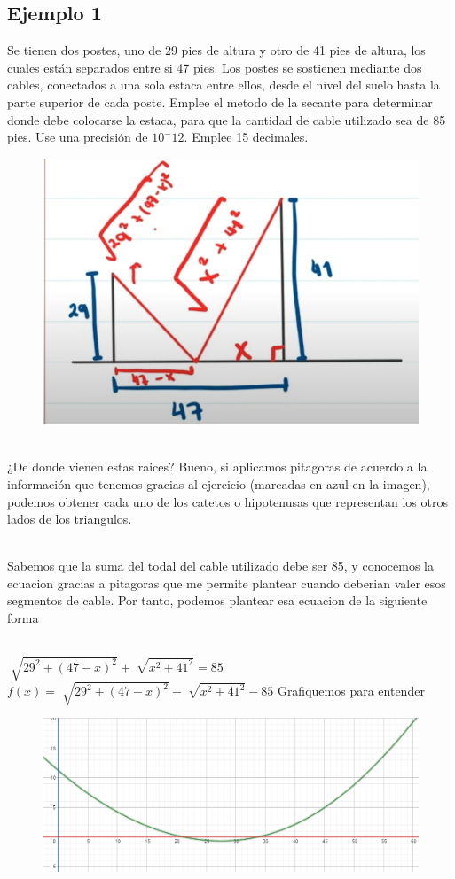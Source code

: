 \documentclass{article}
\theoremstyle{mytheoremstyle}
\theoremstyle{mytheoremstyle}
\theoremstyle{myproblemstyle}
\begin{document}
\subsection*{Ejemplo 1} Se tienen dos postes, uno de 29 pies de altura y otro de 41 pies de altura, los  cuales están separados entre si 47 pies. Los postes se sostienen mediante dos cables, conectados a una sola
estaca entre ellos, desde el nivel del suelo hasta la parte superior de cada poste. Emplee el metodo de la secante para determinar donde debe colocarse la estaca, para que la cantidad de cable utilizado sea de 85 pies.
Use una precisión de $10^-12$. Emplee 15 decimales.
\begin{figure}[ht]
    \includegraphics*[scale=0.9]{img/secante0.png}
\end{figure}
\noindent \\¿De donde vienen estas raices? Bueno, si aplicamos pitagoras de acuerdo a la información que tenemos gracias al ejercicio (marcadas en azul en la imagen), podemos obtener cada uno de los catetos o hipotenusas
que representan los otros lados de los triangulos.

\noindent \\ Sabemos que la suma del todal del cable utilizado debe ser 85, y conocemos la ecuacion gracias a pitagoras que me permite plantear cuando deberian valer esos segmentos de cable.
Por tanto, podemos plantear esa ecuacion de la siguiente forma

\noindent \\ $\sqrt[]{29^2+(47-x)^2}+\sqrt[]{x^2+41^2}=85$
\\$f(x)=\sqrt[]{29^2+(47-x)^2}+\sqrt[]{x^2+41^2}-85$
\pagebreak
\noindent Grafiquemos para entender
\begin{figure}[ht]
    \includegraphics*[scale=0.55]{img/secante01.png}
\end{figure}
\end{document}
